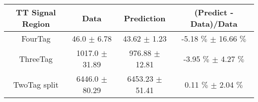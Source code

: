 \begin{footnotesize} 
\begin{tabular}{c|c|c|c} 
TT Signal Region & Data & Prediction & (Predict - Data)/Data \\ 
\hline\hline 
FourTag & 46.0 $\pm$ 6.78 & 43.62 $\pm$ 1.23 & -5.18 $\%$  $\pm$ 16.66 $\%$ \\ 
\hline 
ThreeTag & 1017.0 $\pm$ 31.89 & 976.88 $\pm$ 12.81 & -3.95 $\%$  $\pm$ 4.27 $\%$ \\ 
\hline 
TwoTag split & 6446.0 $\pm$ 80.29 & 6453.23 $\pm$ 51.41 & 0.11 $\%$  $\pm$ 2.04 $\%$ \\ 
\hline\hline 
\end{tabular} 
\end{footnotesize} 
\newline 
